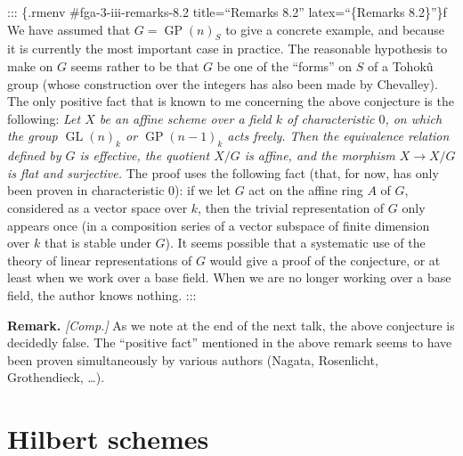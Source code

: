 \documentclass{article}
\newenvironment{rmenv}[1]
  {\phantomsection\par\smallskip\noindent\textbf{#1.}\rmfamily}
  {\par\smallskip}
\newcommand{\oldpage}[1]{\marginpar{\footnotesize$\Big\vert$ \textit{p.~#1}}}
\theoremstyle{definition}
\theoremstyle{definition}
\theoremstyle{definition}
\theoremstyle{definition}
\theoremstyle{remark}
\begin{document}
::: \{.rmenv \#fga-3-iii-remarks-8.2 title=``Remarks 8.2'' latex=``\{Remarks 8.2\}''\}f
We have assumed that \(G=\operatorname{GP}(n)_S\) to give a concrete example, and because it is currently the most important case in practice.
The reasonable hypothesis to make on \(G\) seems rather to be that \(G\) be one of the ``forms'' on \(S\) of a Tohokû group (whose construction over the integers has also been made by Chevalley).
The only positive fact that is known to me concerning the above conjecture is the following:
\emph{Let \(X\) be an affine scheme over a field \(k\) of characteristic \(0\), on which the group \(\operatorname{GL}(n)_k\) or \(\operatorname{GP}(n-1)_k\) acts freely. Then the equivalence relation defined by \(G\) is effective, the quotient \(X/G\) is affine, and the morphism \(X\to X/G\) is flat and surjective.}
The proof uses the following fact (that, for now, has only been proven in characteristic \(0\)):
if we let \(G\) act on the affine ring \(A\) of \(G\), considered as a vector space over \(k\), then the trivial representation of \(G\) only appears once (in a composition series of a vector subspace of finite dimension over \(k\) that is stable under \(G\)).
\oldpage{212-20}It seems possible that a systematic use of the theory of linear representations of \(G\) would give a proof of the conjecture, or at least when we work over a base field.
When we are no longer working over a base field, the author knows nothing.
:::

\begin{rmenv}{Remark}
\emph{{[}Comp.{]}}
As we note at the end of the next talk, the above conjecture is decidedly false.
The ``positive fact'' mentioned in the above remark seems to have been proven simultaneously by various authors (Nagata, Rosenlicht, Grothendieck, \ldots).

\end{rmenv}

\hypertarget{fga-3.iv}{%
\section{Hilbert schemes}\label{fga-3.iv}}

\providecommand{\scr}[1]{{\mathscr{#1}}}
\renewcommand{\cal}[1]{{\mathcal{#1}}}
\renewcommand{\frak}[1]{{\mathfrak{#1}}}
\renewcommand{\geq}{\geqslant}
\renewcommand{\leq}{\leqslant}
\end{document}
